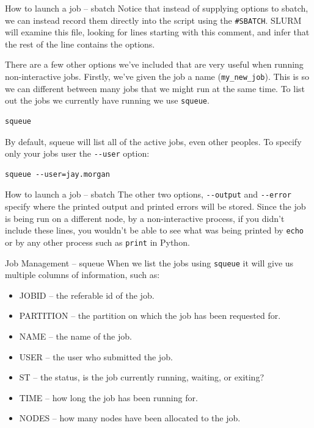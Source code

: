\documentclass[10pt]{beamer}
\begin{document}
\begin{frame}[label={sec:org51f26ac},fragile]{How to launch a job -- sbatch}
 Notice that instead of supplying options to sbatch, we can instead record them
directly into the script using the \texttt{\#SBATCH}. SLURM will examine this file,
looking for lines starting with this comment, and infer that the rest of the
line contains the options.

There are a few other options we've included that are very useful when running
non-interactive jobs. Firstly, we've given the job a name (\texttt{my\_new\_job}). This is
so we can different between many jobs that we might run at the same time. To
list out the jobs we currently have running we use \texttt{squeue}.

\begin{verbatim}
squeue
\end{verbatim}

By default, squeue will list all of the active jobs, even other peoples. To
specify only your jobs user the \texttt{-{}-user} option:

\begin{verbatim}
squeue --user=jay.morgan
\end{verbatim}
\end{frame}

\begin{frame}[label={sec:orgea3d845},fragile]{How to launch a job -- sbatch}
 The other two options, \texttt{-{}-output} and \texttt{-{}-error} specify where the printed output and
printed errors will be stored. Since the job is being run on a different node,
by a non-interactive process, if you didn't include these lines, you wouldn't be
able to see what was being printed by \texttt{echo} or by any other process such as \texttt{print}
in Python.
\end{frame}

\begin{frame}[label={sec:orgaeb963a},fragile]{Job Management -- squeue}
 When we list the jobs using \texttt{squeue} it will give us multiple columns of
information, such as:

\begin{itemize}
\item JOBID -- the referable id of the job.
\item PARTITION -- the partition on which the job has been requested for.
\item NAME -- the name of the job.
\item USER -- the user who submitted the job.
\item ST -- the status, is the job currently running, waiting, or exiting?
\item TIME -- how long the job has been running for.
\item NODES -- how many nodes have been allocated to the job.
\end{itemize}
\end{frame}
\end{document}

